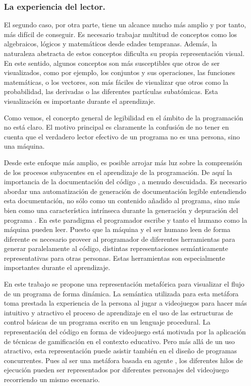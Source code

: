 \documentclass{llncs}
\begin{document}
\subsubsection{La experiencia del lector.}
\label{subsec:reader}

El segundo caso, por otra parte, tiene un alcance mucho más amplio y por tanto, más difícil de conseguir. Es necesario trabajar multitud de conceptos como los algebraicos, lógicos y matemáticos desde edades tempranas. Además, la naturaleza abstracta de estos conceptos dificulta su propia representación visual. En este sentido, algunos conceptos son más susceptibles que otros de ser visualizados, como por ejemplo, los conjuntos y sus operaciones, las funciones matemáticas, o los vectores, son más fáciles de visualizar que otros como la probabilidad, las derivadas o las diferentes partículas subatómicas. Esta visualización es importante durante el aprendizaje.

Como vemos, el concepto general de legibilidad en el ámbito de la programación no está claro. El motivo principal es claramente la confusión de no tener en cuenta que el verdadero lector efectivo de un programa no es una persona, sino una máquina. 

Desde este enfoque más amplio, es posible arrojar más luz sobre la comprensión de los procesos subyacentes en el aprendizaje de la programación. De aquí la importancia de la documentación del código \cite{tenny1988program}, a menudo descuidada. Es necesario abordar una automatización de generación de documentación legible entendiendo esta documentación, no sólo como un contenido añadido al programa, sino más bien como una característica intrínseca durante la generación y depuración del programa \cite{baecker1988enhancing}. En este paradigma el programador escribe y tanto el humano como la máquina pueden leer. Puesto que la máquina y el ser humano leen de forma diferente es necesario proveer al programador de diferentes herramientas para generar paralelamente al código, distintas representaciones semánticamente representativas para otras personas. Estas herramientas son especialmente importantes durante el aprendizaje.

En este trabajo se propone una representación metafórica para visualizar el flujo de un programa de forma dinámica. La semántica utilizada para esta metáfora toma prestada la experiencia de la persona al jugar a videojuegos para hacer más intuitivo y atractivo el proceso de aprendizaje en el uso de las estructuras de control básicas de un programa escrito en un lenguaje procedural. La representación del código en forma de videojuego está motivada por la aplicación de técnicas de gamificación en el contexto educativo. Pero más allá de un uso atractivo, esta representación puede asistir también en el diseño de programas concurrentes. Pues al ser una metáfora basada en agente \cite{travers1996programming}, los diferentes hilos de ejecución pueden ser representados por diferentes personajes del videojuego recorriendo un mismo escenario.
\end{document}
